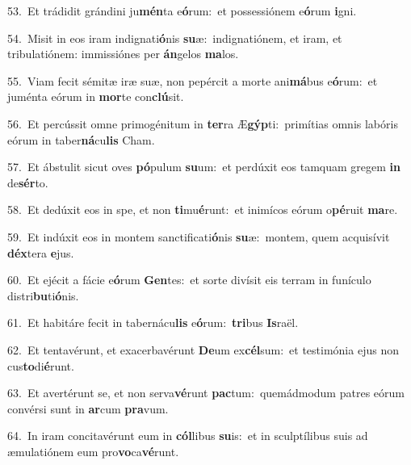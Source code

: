 {\numbfont\textcolor{\numbcolor}{53.}}~Et trádidit grándini ju\-\textbf{mén}\-ta e\-\textbf{ó}\-rum:~\star et possessiónem e\-\textbf{ó}\-rum \textbf{i}\-gni.\par
{\numbfont\textcolor{\numbcolor}{54.}}~Misit in eos iram indignati\-\textbf{ó}\-nis \textbf{su}\-æ:~\star indignatiónem, et iram, et tribulatiónem: immissiónes per \textbf{án}\-gelos \textbf{ma}\-los.\par
{\numbfont\textcolor{\numbcolor}{55.}}~Viam fecit sémitæ iræ suæ, non pepércit a morte ani\-\textbf{má}\-bus e\-\textbf{ó}\-rum:~\star et juménta eórum in \textbf{mor}\-te con\-\textbf{clú}\-sit.\par
{\numbfont\textcolor{\numbcolor}{56.}}~Et percússit omne primogénitum in \textbf{ter}\-ra Æ\-\textbf{gýp}\-ti:~\star primítias omnis labóris eórum in taber\-\textbf{ná}\-cu\textbf{lis} Cham.\par
{\numbfont\textcolor{\numbcolor}{57.}}~Et ábstulit sicut oves \textbf{pó}\-pulum \textbf{su}\-um:~\star et perdúxit eos tamquam gregem \textbf{in} de\-\textbf{sér}\-to.\par
{\numbfont\textcolor{\numbcolor}{58.}}~Et dedúxit eos in spe, et non \textbf{ti}\-mu\-\textbf{é}\-runt:~\star et inimícos eórum o\-\textbf{pé}\-ruit \textbf{ma}\-re.\par
{\numbfont\textcolor{\numbcolor}{59.}}~Et indúxit eos in montem sanctificati\-\textbf{ó}\-nis \textbf{su}\-æ:~\star montem, quem acquisívit \textbf{déx}\-tera \textbf{e}\-jus.\par
{\numbfont\textcolor{\numbcolor}{60.}}~Et ejécit a fácie e\-\textbf{ó}\-rum \textbf{Gen}\-tes:~\star et sorte divísit eis terram in funículo distri\-\textbf{bu}\-ti\-\textbf{ó}\-nis.\par
{\numbfont\textcolor{\numbcolor}{61.}}~Et habitáre fecit in tabernácu\textbf{lis} e\-\textbf{ó}\-rum:~\star \textbf{tri}\-bus \textbf{Is}\-raël.\par
{\numbfont\textcolor{\numbcolor}{62.}}~Et tentavérunt, et exacerbavérunt \textbf{De}\-um ex\-\textbf{cél}\-sum:~\star et testimónia ejus non cus\-\textbf{to}\-di\-\textbf{é}\-runt.\par
{\numbfont\textcolor{\numbcolor}{63.}}~Et avertérunt se, et non serva\-\textbf{vé}\-runt \textbf{pac}\-tum:~\star quemádmodum patres eórum convérsi sunt in \textbf{ar}\-cum \textbf{pra}\-vum.\par
{\numbfont\textcolor{\numbcolor}{64.}}~In iram concitavérunt eum in \textbf{cól}\-libus \textbf{su}\-is:~\star et in sculptílibus suis ad æmulatiónem eum pro\-\textbf{vo}\-ca\-\textbf{vé}\-runt.\par
